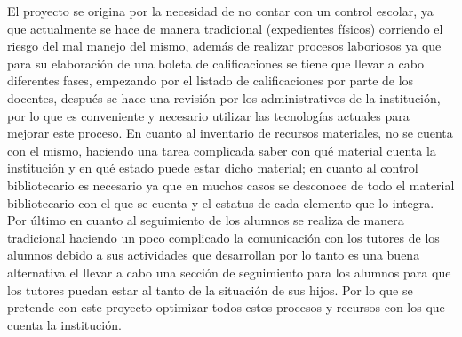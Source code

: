 {\large El proyecto se origina por la necesidad de no contar con un control escolar, ya que actualmente se hace de manera tradicional (expedientes físicos) corriendo el riesgo del mal manejo del mismo, además de realizar procesos laboriosos ya que para su elaboración de una boleta de calificaciones se tiene que llevar a cabo diferentes fases, empezando por el listado de calificaciones por parte de los docentes, después se hace una revisión por los administrativos de la institución, por lo que es conveniente y necesario utilizar las tecnologías actuales para mejorar este proceso.}
\vspace{0.5cm}
{\large En cuanto al inventario de recursos materiales, no se cuenta con el mismo, haciendo una tarea complicada saber con qué material cuenta la institución y en qué estado puede estar dicho material; en cuanto al control bibliotecario es necesario ya que en muchos casos se desconoce de todo el material bibliotecario con el que se cuenta y el estatus de cada elemento que lo integra.}
\vspace{0.5cm}
{\large Por último en cuanto al seguimiento de los alumnos se realiza de manera tradicional haciendo un poco complicado la comunicación con los tutores de los alumnos debido a sus actividades que desarrollan por lo tanto es una buena alternativa el llevar a cabo una sección de seguimiento para los alumnos para que los tutores puedan estar al tanto de la situación de sus hijos. Por lo que se pretende con este proyecto optimizar todos estos procesos y recursos con los que cuenta la institución. }\\